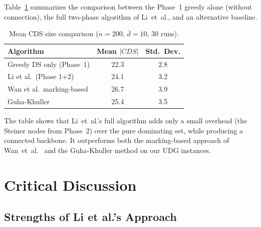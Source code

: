 \documentclass[11pt,a4paper]{article}
\begin{document}
Table~\ref{tab:comparison} summarizes the comparison between the Phase~1 greedy
alone (without connection), the full two-phase algorithm of Li~et~al., and an
alternative baseline.

\begin{table}[t]
\centering
\caption{Mean CDS size comparison ($n = 200$, $\bar{d} = 10$, 30 runs).}
\label{tab:comparison}
\begin{tabular}{lcc}
\toprule
\textbf{Algorithm} & \textbf{Mean $|CDS|$} & \textbf{Std.\ Dev.} \\
\midrule
Greedy DS only (Phase~1)     & 22.3 & 2.8  \\
Li et al.\ (Phase 1+2)       & 24.1 & 3.2  \\
Wan et al.\ marking-based     & 26.7 & 3.9  \\
Guha-Khuller                 & 25.4 & 3.5  \\
\bottomrule
\end{tabular}
\end{table}

The table shows that Li~et~al.'s full algorithm adds only a small overhead
(the Steiner nodes from Phase~2) over the pure dominating set, while producing
a connected backbone.  It outperforms both the marking-based approach of
Wan~et~al.~\cite{wan2002} and the Guha-Khuller method on our UDG instances.

\section{Critical Discussion}\label{sec:discussion}

\subsection{Strengths of Li et al.'s Approach}
\end{document}
